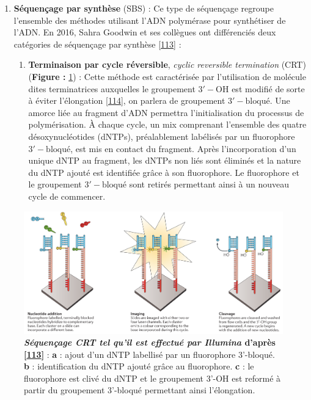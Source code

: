 \documentclass[12pt,a4paper,twoside]{ugathesis}
\providecommand{\tightlist}{%
  \setlength{\itemsep}{0pt}\setlength{\parskip}{0pt}}
\theoremstyle{definition}
\theoremstyle{definition}
\theoremstyle{definition}
\theoremstyle{remark}
\begin{document}
\begin{enumerate}
\def\labelenumi{\arabic{enumi}.}
\tightlist
\item
  \textbf{Séquençage par synthèse} (SBS) : Ce type de séquençage
  regroupe l'ensemble des méthodes utilisant l'ADN polymérase pour
  synthétiser de l'ADN. En 2016, Sahra Goodwin et ses collègues ont
  différenciés deux catégories de séquençage par synthèse
  {[}\protect\hyperlink{ref-Goodwin2016}{113}{]} :

  \begin{enumerate}
  \def\labelenumii{\alph{enumii}.}
  \tightlist
  \item
    \textbf{Terminaison par cycle réversible}, \emph{cyclic reversible
    termination} (CRT) (\textbf{Figure : }\ref{fig:pictcrtSeq}) : Cette
    méthode est caractérisée par l'utilisation de molécule dites
    terminatrices auxquelles le groupement \(\mathrm{3'-OH}\) est
    modifié de sorte à éviter l'élongation
    {[}\protect\hyperlink{ref-Guo2008}{114}{]}, on parlera de groupement
    \(\mathrm{3'-bloqué}\). Une amorce liée au fragment d'ADN permettra
    l'initialisation du processus de polymérisation. À chaque cycle, un
    mix comprenant l'ensemble des quatre désoxynucléotides (dNTPs),
    préalablement labélisés par un fluorophore \(\mathrm{3'-bloqué}\),
    est mis en contact du fragment. Après l'incorporation d'un unique
    dNTP au fragment, les dNTPs non liés sont éliminés et la nature du
    dNTP ajouté est identifiée grâce à son fluorophore. Le fluorophore
    et le groupement \(\mathrm{3'-bloqué}\) sont retirés permettant
    ainsi à un nouveau cycle de commencer.
  \end{enumerate}
\end{enumerate}

\begin{figure}

{\centering \includegraphics[scale=.24]{figure/CRT_seq_illumina} 

}

\caption[Séquençage CRT tel qu'il est effectué par Illumina]{\textbf{\emph{Séquençage CRT tel qu'il est effectué par
Illumina} d'après {[}\protect\hyperlink{ref-Goodwin2016}{113}{]}} :
\textbf{a} : ajout d'un dNTP labellisé par un fluorophore 3'-bloqué.
\textbf{b} : identification du dNTP ajouté grâce au fluorophore.
\textbf{c} : le fluorophore est clivé du dNTP et le groupement 3'-OH est
reformé à partir du groupement 3'-bloqué permettant ainsi l'élongation.}\label{fig:pictcrtSeq}
\end{figure}
\end{document}
